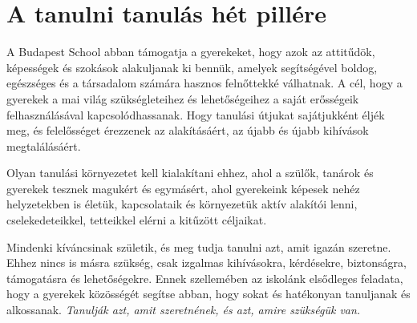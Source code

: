 \section{A tanulni tanulás hét pillére}
\label{sec:iskola_celja}

A Budapest School abban támogatja a gyerekeket, hogy azok az
attitűdök, képességek és szokások alakuljanak ki bennük, amelyek segítségével
boldog, egészséges és a társadalom számára hasznos felnőttekké válhatnak. A
cél, hogy a gyerekek a mai világ szükségleteihez és lehetőségeihez a saját
erősségeik felhasználásával kapcsolódhassanak.	Hogy tanulási útjukat
sajátjukként éljék meg, és felelősséget érezzenek az alakításáért, az újabb és
újabb kihívások megtalálásáért.

Olyan tanulási környezetet kell kialakítani ehhez, ahol a szülők, tanárok és
gyerekek tesznek magukért és egymásért, ahol gyerekeink képesek nehéz
helyzetekben is életük, kapcsolataik és környezetük aktív alakítói lenni,
cselekedeteikkel, tetteikkel elérni a kitűzött céljaikat.

Mindenki kíváncsinak születik, és meg tudja tanulni azt, amit
igazán szeretne. Ehhez nincs is másra szükség, csak izgalmas kihívásokra, kérdésekre,
biztonságra, támogatásra és lehetőségekre. Ennek szellemében az iskolánk elsődleges feladata, hogy a gyerekek közösségét
segítse abban, hogy sokat és hatékonyan tanuljanak és alkossanak.
\emph{Tanulják azt, amit szeretnének, és azt, amire szükségük van.}
